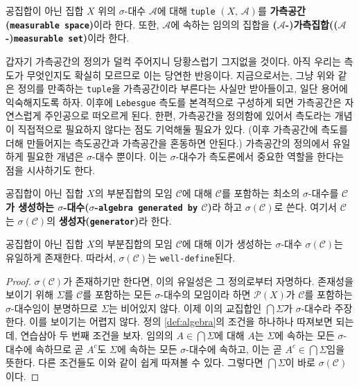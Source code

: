 \begin{definition}\label{def:measurable}
    공집합이 아닌 집합 $X$ 위의 $\sigma$-대수 $\mathcal{A}$에 대해 \texttt{tuple} $(X,\,\mathcal{A})$를 \textbf{가측공간(\texttt{measurable space})}이라 한다. 또한, $\mathcal{A}$에 속하는 임의의 집합을 \textbf{($\mathcal{A}$-)가측집합(($\mathcal{A}$-)\texttt{measurable set})}이라 한다.
\end{definition}

갑자기 가측공간의 정의가 덜컥 주어지니 당황스럽기 그지없을 것이다. 아직 우리는 측도가 무엇인지도 확실히 모르므로 이는 당연한 반응이다. 지금으로서는, 그냥 위와 같은 정의를 만족하는 \texttt{tuple}을 가측공간이라 부른다는 사실만 받아들이고, 일단 용어에 익숙해지도록 하자. 이후에 \texttt{Lebesgue} 측도를 본격적으로 구성하게 되면 가측공간은 자연스럽게 주인공으로 떠오르게 된다. 한편, 가측공간을 정의함에 있어서 측도라는 개념이 직접적으로 필요하지 않다는 점도 기억해둘 필요가 있다. (이후 가측공간에 측도를 더해 만들어지는 측도공간과 가측공간을 혼동하면 안된다.) 가측공간의 정의에서 유일하게 필요한 개념은 $\sigma$-대수 뿐이다. 이는 $\sigma$-대수가 측도론에서 중요한 역할을 한다는 점을 시사하기도 한다.

\begin{definition}
    공집합이 아닌 집합 $X$의 부분집합의 모임 $\mathcal{C}$에 대해 $\mathcal{C}$를 포함하는 최소의 $\sigma$-대수를 \textbf{$\mathcal{C}$가 생성하는 $\sigma$-대수($\sigma$-\texttt{algebra generated by} $\mathcal{C}$)}라 하고 $\sigma(\mathcal{C})$로 쓴다. 여기서 $\mathcal{C}$는 $\sigma(\mathcal{C})$의 \textbf{생성자(\texttt{generator})}라 한다.
\end{definition}

\begin{proposition}\label{prop:generatedSigmaAlgebra}
    공집합이 아닌 집합 $X$의 부분집합의 모임 $\mathcal{C}$에 대해 이가 생성하는 $\sigma$-대수 $\sigma(\mathcal{C})$는 유일하게 존재한다. 따라서, $\sigma(\mathcal{C})$는 \texttt{well-define}된다.
\end{proposition}

\begin{proof}
    $\sigma(\mathcal{C})$가 존재하기만 한다면, 이의 유일성은 그 정의로부터 자명하다. 존재성을 보이기 위해 $\Sigma$를 $\mathcal{C}$를 포함하는 모든 $\sigma$-대수의 모임이라 하면 $\mathcal{P}(X)$가 $\mathcal{C}$를 포함하는 $\sigma$-대수임이 분명하므로 $\Sigma$는 비어있지 않다. 이제 이의 교집합인 $\bigcap\Sigma$가 $\sigma$-대수라 주장한다. 이를 보이기는 어렵지 않다. 정의 \ref{def:algebra}의 조건을 하나하나 따져보면 되는데, 연습삼아 두 번째 조건을 보자. 임의의 $A\in\bigcap\Sigma$에 대해 $A$는 $\Sigma$에 속하는 모든 $\sigma$-대수에 속하므로 곧 $A^c$도 $\Sigma$에 속하는 모든 $\sigma$-대수에 속하고, 이는 곧 $A^c\in\bigcap\Sigma$임을 뜻한다. 다른 조건들도 이와 같이 쉽게 따져볼 수 있다. 그렇다면 $\bigcap\Sigma$이 바로 $\sigma(\mathcal{C})$이다.
\end{proof}

